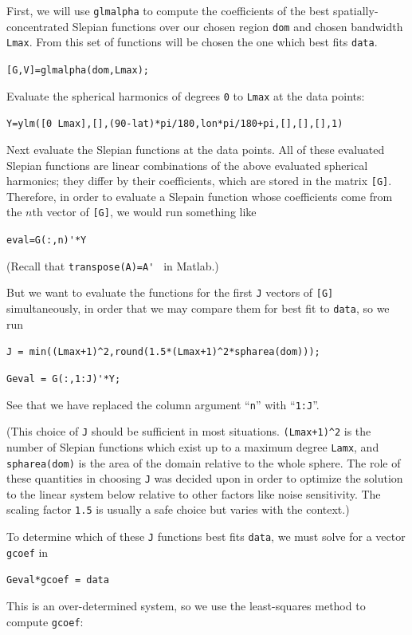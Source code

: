 \documentclass{article}
\begin{document}
First, we will use \verb!glmalpha! to compute the coefficients of the best spatially-concentrated Slepian functions over our chosen region \verb!dom! and chosen bandwidth \verb!Lmax!. From this set of functions will be chosen the one which best fits \verb!data!.

\verb![G,V]=glmalpha(dom,Lmax);!

Evaluate the spherical harmonics of degrees \verb!0! to \verb!Lmax! at the data points:

\verb!Y=ylm([0 Lmax],[],(90-lat)*pi/180,lon*pi/180+pi,[],[],[],1)!

Next evaluate the Slepian functions at the data points. All of these evaluated Slepian functions are linear combinations of the above evaluated spherical harmonics; they differ by their coefficients, which are stored in the matrix \verb+[G]+. Therefore, in order to evaluate a Slepain function whose coefficients come from the $n$th vector of \verb+[G]+, we would run something like

\verb!eval=G(:,n)'*Y!

(Recall that \verb!transpose(A)=A' ! in Matlab.)

But we want to evaluate the  functions for the first \verb!J! vectors of \verb![G]! simultaneously, in order that we may compare them for best fit to \verb!data!, so we run

\verb!J = min((Lmax+1)^2,round(1.5*(Lmax+1)^2*spharea(dom)));!

\verb!Geval = G(:,1:J)'*Y;!

See that we have replaced the column argument “\verb+n+” with “\verb+1:J+”.

(This choice of \verb!J! should be sufficient in most situations. \verb!(Lmax+1)^2! is the number of Slepian functions which exist up to a maximum degree \verb!Lamx!, and \verb!spharea(dom)! is the area of the domain relative to the whole sphere. The role of these quantities in choosing \verb!J! was decided upon in order to optimize the solution to the linear system below relative to other factors like noise sensitivity. The scaling factor \verb!1.5! is usually a safe choice but varies with the context.)

To determine which of these \verb!J! functions best fits \verb!data!, we must solve for a vector \verb!gcoef! in

\verb!Geval*gcoef = data!

This is an over-determined system, so we use the least-squares method to compute \verb!gcoef!:
\end{document}
